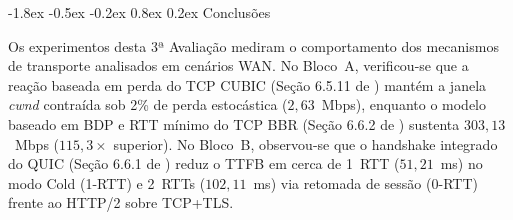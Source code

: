 \documentclass[12pt]{article}
\makeatletter
\renewcommand\section{\@startsection{section}{1}{\z@}%
                       {-1.8ex \@plus -0.5ex \@minus -0.2ex}%
                       {0.8ex \@plus 0.2ex}%
                       {\reset@font\large\bfseries}}
\makeatother
\begin{document}
\section{Conclusões}

Os experimentos desta 3ª Avaliação mediram o comportamento dos mecanismos de transporte analisados em cenários WAN. No Bloco~A, verificou-se que a reação baseada em perda do TCP CUBIC (Seção 6.5.11 de \cite{tanenbaum2021}) mantém a janela \textit{cwnd} contraída sob 2\% de perda estocástica ($2{,}63$~Mbps), enquanto o modelo baseado em BDP e RTT mínimo do TCP BBR (Seção 6.6.2 de \cite{tanenbaum2021}) sustenta $303{,}13$~Mbps ($115{,}3\times$ superior). No Bloco~B, observou-se que o handshake integrado do QUIC (Seção 6.6.1 de \cite{tanenbaum2021}) reduz o TTFB em cerca de 1~RTT ($51{,}21$~ms) no modo Cold (1-RTT) e 2~RTTs ($102{,}11$~ms) via retomada de sessão (0-RTT) frente ao HTTP/2 sobre TCP+TLS.

{\small


}
\end{document}
